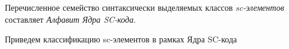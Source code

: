 \begin{comment}
	\end{scnrelfromlist}
	\scnexplanation{Каждая \textit{sc-пара} (константная пара sc-элементов), каждая \textit{переменная sc-пара} и каждое \textit{обозначение sc-пары} связывается со своими элементами не явно вводимыми константными или переменными \textit{sc-парами позитивной принадлежности}, а реализуемыми на "физическом"{} уровне связями (парами) инцидентности. Таким образом \textit{пары инцидентности sc-элементов} --- это специальным образом синтаксически выделенные константные или переменные \textit{sc-пары позитивной принадлежности}, связывающие \textit{обозначения sc-пар} с элементами этих пар. Соответственно этому синтаксические особенности имеют и все \textit{обозначения sc-пар}, поскольку только из них могут выходить ориентированные \textit{пары инцидентности}. Поэтому с синтаксической точки зрения \textit{обозначения sc-пар} будем называть \textbf{\textit{sc-коннекторами}}, \textit{обозначения неориентированных sc-пар} --- \textbf{\textit{sc-ребрами}}, а \textit{обозначения ориентированных sc-пар} --- \textbf{\textit{sc-дугами}}. При этом из класса \textit{пар инцидентности sc-элементов} выделим подкласс пар, связывающих обозначения sc-дуг с теми sc-элементами, в которые эти дуги входят. Такую пару инцидентности будем называть \textbf{\textit{парой инцидентности входящей sc-дуги}}.}
\end{SCn}
\end{comment}

Перечисленное семейство синтаксически выделяемых классов \textit{sc-элементов} составляет \textit{Алфавит Ядра SC-кода\scnsupergroupsign}.

\begin{SCn}
	\begin{scneqtoset}
	\end{scneqtoset}
\end{SCn}

Приведем  классификацию sc-элементов в рамках Ядра SC-кода

